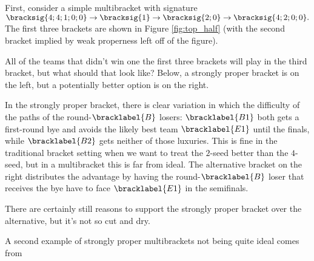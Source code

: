 {    First, consider a simple multibracket with signature $\bracksig{4;4;1;0;0} \to \bracksig{1} \to \bracksig{2;0} \to \bracksig{4;2;0;0}.$ The first three brackets are shown in Figure \ref{fig:top_half} (with the second bracket implied by weak properness left off of the figure).


    All of the teams that didn't win one the first three brackets will play in the third bracket, but what should that look like? Below, a strongly proper bracket is on the left, but a potentially better option is on the right.


    In the strongly proper bracket, there is clear variation in which the difficulty of the paths of the round-$\bracklabel{B}$ losers: $\bracklabel{B1}$ both gets a first-round bye and avoids the likely best team $\bracklabel{E1}$ until the finals, while $\bracklabel{B2}$ gets neither of those luxuries. This is fine in the traditional bracket setting when we want to treat the $2$-seed better than the $4$-seed, but in a multibracket this is far from ideal. The alternative bracket on the right distributes the advantage by having the round-$\bracklabel{B}$ loser that receives the bye have to face $\bracklabel{E1}$ in the semifinals.

    There are certainly still reasons to support the strongly proper bracket over the alternative, but it's not so cut and dry.

    A second example of strongly proper multibrackets not being quite ideal comes from 
    





}




